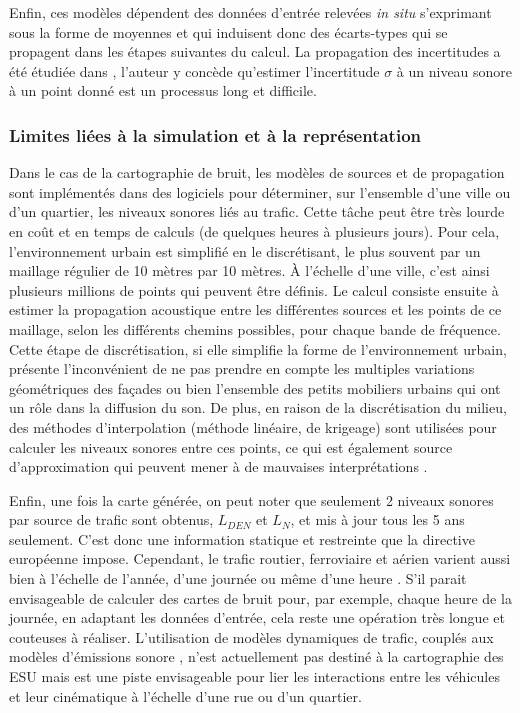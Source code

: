 Enfin, ces modèles dépendent des données d'entrée relevées \textit{in situ} s'exprimant sous la forme de moyennes et qui induisent donc des écarts-types qui se propagent dans les étapes suivantes du calcul. La propagation des incertitudes a été étudiée dans \cite{probst2005uncertainties}, l'auteur y concède qu'estimer l'incertitude $\sigma$ à un niveau sonore à un point donné est un processus long et difficile.

\subsubsection{Limites liées à la simulation et à la représentation}

Dans le cas de la cartographie de bruit, les modèles de sources et de propagation sont implémentés dans des logiciels pour déterminer, sur l'ensemble d'une ville ou d'un quartier, les niveaux sonores liés au trafic. Cette tâche peut être très lourde en coût et en temps de calculs (de quelques heures à plusieurs jours). Pour cela, l'environnement urbain est simplifié en le discrétisant, le plus souvent par un maillage régulier de 10 mètres par 10 mètres. À l'échelle d'une ville, c'est ainsi plusieurs millions de points qui peuvent être définis. Le calcul consiste ensuite à estimer la propagation acoustique entre les différentes sources et les points de ce maillage, selon les différents chemins possibles, pour chaque bande de fréquence.
Cette étape de discrétisation, si elle simplifie la forme de l'environnement urbain, présente l'inconvénient de ne pas prendre en compte les multiples variations géométriques des façades ou bien l'ensemble des petits mobiliers urbains qui ont un rôle dans la diffusion du son. 
De plus, en raison de la discrétisation du milieu, des méthodes d'interpolation (méthode linéaire, de krigeage) sont utilisées pour calculer les niveaux sonores entre ces points, ce qui est également source d'approximation qui peuvent mener à de mauvaises interprétations \cite{van_leeuwen_noise_2015}.

Enfin, une fois la carte générée, on peut noter que seulement 2 niveaux sonores par source de trafic sont obtenus, $L_{DEN}$ et $L_N$, et mis à jour tous les 5 ans seulement. C'est donc une information statique et restreinte que la directive européenne impose. Cependant, le trafic routier, ferroviaire et aérien varient aussi bien à l'échelle de l'année, d'une journée ou même d'une heure \cite{lv2015traffic}. S'il parait envisageable de calculer des cartes de bruit pour, par exemple, chaque heure de la journée, en adaptant les données d'entrée, cela reste une opération très longue et couteuses à réaliser.
L'utilisation de modèles dynamiques de trafic, couplés aux modèles d'émissions sonore  \cite{can2010traffic}, n'est actuellement pas destiné à la cartographie des ESU mais est une piste envisageable pour lier les interactions entre les véhicules et leur cinématique à l'échelle d'une rue ou d'un quartier.

